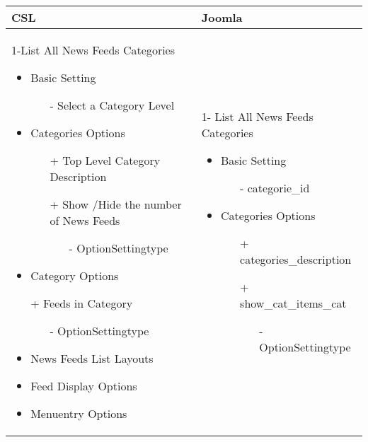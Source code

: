 \begin{minipage}{0.7\textwidth}
\begin{tabular}{|p{} | p{}|}
\hline
\textbf{CSL} & \textbf{Joomla} \\ 
\hline
 1-List All News Feeds Categories
   \begin{itemize}
     \item Basic  Setting 
    		\begin{enumerate}
    			\item[-] Select a Category Level
    		\end{enumerate}
    	\item Categories Options
 	   	\begin{enumerate}
 	    \item[+] Top Level Category Description
 	    \item[+] Show /Hide the number of News Feeds 
 	    	  \begin{enumerate}
 	    			 \item[-] OptionSettingtype
 	    	\end{enumerate}
 	   \end{enumerate}
    	\item Category Options
    	\item[+] Feeds in Category 
    		    	  \begin{enumerate}
    		    			 \item[-] OptionSettingtype
    		    	\end{enumerate}
    \item News Feeds List Layouts
    \item Feed Display Options
 	\item Menuentry Options
  \end{itemize}
 & 
1- List All News Feeds Categories
  \begin{itemize}
    \item Basic  Setting 
   		\begin{enumerate}
   			\item[-] categorie\_id
   		\end{enumerate}
   	\item Categories Options
	   	\begin{enumerate}
	    \item[+]categories\_description
	    \item[+]show\_cat\_items\_cat 
	    	  \begin{enumerate}
	    			 \item[-] OptionSettingtype

\end{enumerate}
\end{enumerate}
\end{itemize}
\end{tabular}
\end{minipage}
